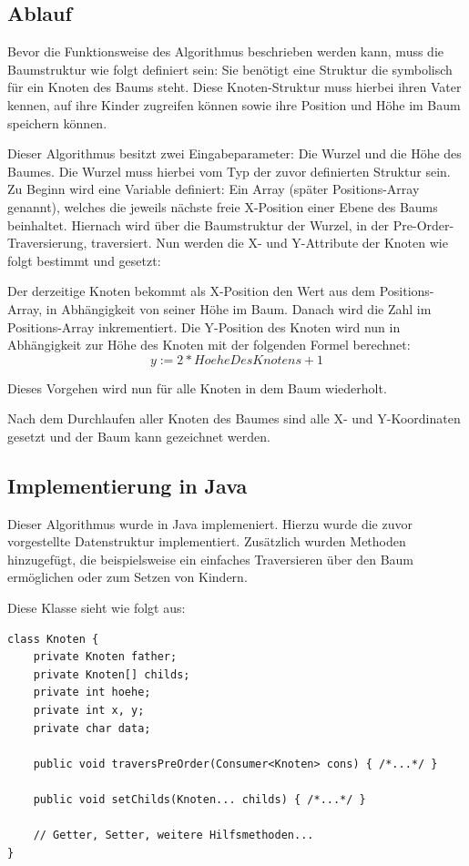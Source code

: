\label{chap:kapitel3_1_Ablauf}
\subsection{Ablauf}
Bevor die Funktionsweise des Algorithmus beschrieben werden kann, muss die Baumstruktur 
wie folgt definiert sein: Sie benötigt eine Struktur die symbolisch für ein Knoten des Baums steht. 
Diese Knoten-Struktur muss hierbei ihren Vater kennen, auf ihre Kinder zugreifen können sowie ihre Position und
Höhe im Baum speichern können.

Dieser Algorithmus besitzt zwei Eingabeparameter: Die Wurzel und die Höhe des Baumes.
Die Wurzel muss hierbei vom Typ der zuvor definierten Struktur sein. Zu Beginn wird eine Variable definiert:
Ein Array (später Positions-Array genannt), welches die jeweils nächste freie X-Position einer Ebene des Baums beinhaltet.
Hiernach wird über die Baumstruktur der Wurzel, in der Pre-Order-Traversierung, traversiert.
Nun werden die X- und Y-Attribute der Knoten wie folgt bestimmt und gesetzt:

Der derzeitige Knoten bekommt als X-Position den Wert aus dem Positions-Array, in Abhängigkeit von seiner Höhe im Baum.
Danach wird die Zahl im Positions-Array inkrementiert. Die Y-Position des Knoten wird nun in Abhängigkeit zur Höhe des Knoten
mit der folgenden Formel berechnet: $$y := 2 * HoeheDesKnotens + 1$$

Dieses Vorgehen wird nun für alle Knoten in dem Baum wiederholt. 

Nach dem Durchlaufen aller Knoten des Baumes sind alle X- und Y-Koordinaten gesetzt und der Baum kann gezeichnet werden.

\subsection{Implementierung in Java}
Dieser Algorithmus wurde in Java implemeniert. Hierzu wurde die zuvor vorgestellte Datenstruktur
implementiert. Zusätzlich wurden Methoden hinzugefügt, die beispielsweise
ein einfaches Traversieren über den Baum ermöglichen oder zum Setzen von Kindern.

Diese Klasse sieht wie folgt aus:

\begin{lstlisting}[caption=Vereinfachte Implementierung der Knotenklasse, label=code:knotenclass]
class Knoten {
	private Knoten father;
	private Knoten[] childs;
	private int hoehe;
	private int x, y;
	private char data;

	public void traversPreOrder(Consumer<Knoten> cons) { /*...*/ }

	public void setChilds(Knoten... childs) { /*...*/ }

	// Getter, Setter, weitere Hilfsmethoden...
}
\end{lstlisting}

